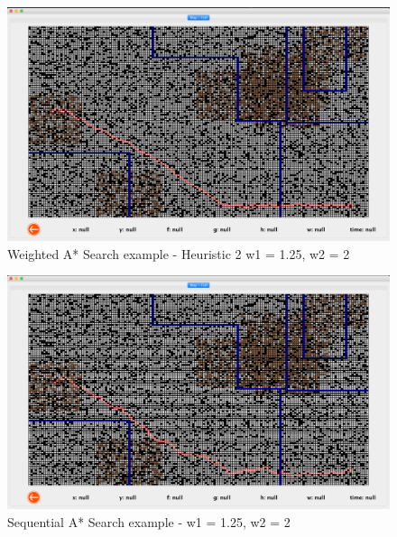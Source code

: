 \begin{figure}[H]
	\centering
	\includegraphics[scale = 0.25]{waster_grid.png}
	\caption{Weighted A* Search example - Heuristic 2 w1 = 1.25, w2 = 2}
	\label{fig: Weighted A* Search Path Trace }
\end{figure}

\begin{figure}[H]
	\centering
	\includegraphics[scale = 0.25]{saster_grid.png}
	\caption{Sequential A* Search example - w1 = 1.25, w2 = 2}
	\label{fig: Sequential A* Search Path Trace }
\end{figure}
